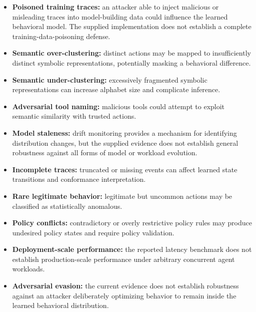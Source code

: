 \documentclass[11pt,a4paper]{article}
\begin{document}
\begin{itemize}[leftmargin=1.4em]

\item \textbf{Poisoned training traces:} an attacker able to inject malicious or
misleading traces into model-building data could influence the learned behavioral model.
The supplied implementation does not establish a complete training-data-poisoning
defense.

\item \textbf{Semantic over-clustering:} distinct actions may be mapped to insufficiently
distinct symbolic representations, potentially masking a behavioral difference.

\item \textbf{Semantic under-clustering:} excessively fragmented symbolic representations
can increase alphabet size and complicate inference.

\item \textbf{Adversarial tool naming:} malicious tools could attempt to exploit semantic
similarity with trusted actions.

\item \textbf{Model staleness:} drift monitoring provides a mechanism for identifying
distribution changes, but the supplied evidence does not establish general robustness
against all forms of model or workload evolution.

\item \textbf{Incomplete traces:} truncated or missing events can affect learned state
transitions and conformance interpretation.

\item \textbf{Rare legitimate behavior:} legitimate but uncommon actions may be classified
as statistically anomalous.

\item \textbf{Policy conflicts:} contradictory or overly restrictive policy rules may
produce undesired policy states and require policy validation.

\item \textbf{Deployment-\allowbreak scale performance:} the reported latency benchmark does not
establish production-\allowbreak scale performance under arbitrary concurrent agent workloads.

\item \textbf{Adversarial evasion:} the current evidence does not establish robustness
against an attacker deliberately optimizing behavior to remain inside the learned
behavioral distribution.

\end{itemize}
\end{document}

